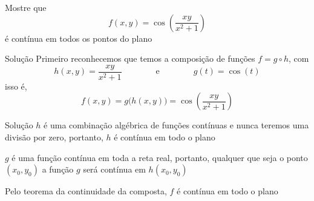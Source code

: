 \begin{question}
  Mostre que
  \[
  f(x, y) = \cos\left(\frac{xy}{x^2+1}\right)
  \]
  é contínua em todos os pontos do plano
\end{question}

\begin{resolution}{Solução}
  Primeiro reconhecemos que temos a composição de funções $f=g\circ h$,
  \pause
  com
  \[
  h(x, y) = \frac{xy}{x^2+1}
  \qquad\qquad\text{e}\qquad\qquad
  g(t) = \cos(t)
  \]
  \pause
  isso é,
  \[
  f(x, y) = g\big(h(x, y)\big) = \cos\left(\frac{xy}{x^2+1}\right)
  \]
\end{resolution}

\begin{resolution}{Solução}
  $h$ é uma combinação algébrica de funções contínuas e nunca teremos
  uma divisão por zero, portanto, $h$ é contínua em todo o plano

  \pause
  \vspace{\baselineskip}
  $g$ é uma função contínua em toda a reta real, portanto, qualquer que seja o ponto
  $(x_0, y_0)$ a função $g$ será contínua em $h(x_0, y_0  )$

  \pause
  \vspace{\baselineskip}
  Pelo teorema da continuidade da composta, $f$ é contínua em todo o plano
\end{resolution}

